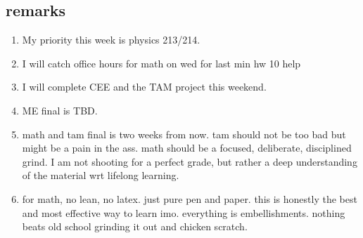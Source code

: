 \documentclass[12pt]{article}
\theoremstyle{definition} %
\theoremstyle{plain} %
\begin{document}
\subsection{remarks}
\begin{enumerate}
\item My priority this week is physics 213/214.
\item I will catch office hours for math on wed for last min hw 10 help
\item I will complete CEE and the TAM project this weekend.
\item ME final is TBD. 
\item math and tam final is two weeks from now. tam should not be too bad but might be a pain in the ass. math should be a focused, deliberate, disciplined grind. I am not shooting for a perfect grade, but rather a deep understanding of the material wrt lifelong learning.
\item for math, no lean, no latex. just pure pen and paper. this is honestly the best and most effective way to learn imo. everything is embellishments. nothing beats old school grinding it out and chicken scratch.
\end{enumerate}  
\end{document}
